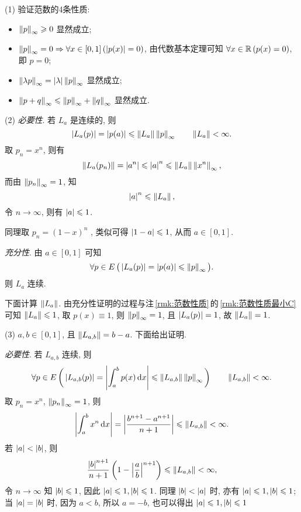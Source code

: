     \begin{Proof}
        (1) 验证范数的4条性质:
        \begin{itemize}
            \item $ \left\| p \right\|_{\infty}\geqslant 0 $ 显然成立;
            \item $ \left\| p \right\|_{\infty}=0 \Rightarrow \forall x\in [0, 1]\,(\left| p(x) \right| =0) $, 由代数基本定理可知 $ \forall x\in\mathbb{R}\,(p(x)=0) $, 即 $ p=0 $;
            \item $ \left\| \lambda p \right\|_{\infty}=\left| \lambda \right| \left\| p \right\|_{\infty} $ 显然成立;
            \item $ \left\| p+q \right\|_{\infty}\leqslant\left\| p \right\|_{\infty}+\left\| q \right\|_{\infty} $ 显然成立.
        \end{itemize}

        (2) \textsl{必要性}. 若 $ L_{a} $ 是连续的, 则
        \[
            \left| L_{a}(p) \right| =\left| p(a) \right| \leqslant \left\| L_{a} \right\|\left\| p \right\|_{\infty}\qquad\left\| L_{a} \right\|<\infty.
        \]
        取 $ p_{n}=x^{n} $, 则有
        \[
            \left\| L_{a}(p_{n}) \right\|=\left| a^{n} \right| \leqslant\left| a \right| ^{n}\leqslant \left\| L_{a} \right\|\left\| x^{n} \right\|_{\infty},
        \]
        而由 $ \left\| p_{n} \right\|_{\infty}=1 $, 知
        \[
            \left| a \right| ^{n}\leqslant\left\| L_{a} \right\|,
        \]
        令 $ n\to\infty $, 则有 $ \left| a \right| \leqslant1 $. 

        同理取 $ p_{n}=(1-x)^{n} $ , 类似可得 $ \left| 1-a \right| \leqslant1 $, 从而 $ a\in[0, 1] $.

        \textsl{充分性}. 由 $ a\in[0, 1] $ 可知
        \[
            \forall p\in E\,\big(\left| L_{a}(p) \right| =\left| p(a) \right| \leqslant\left\| p \right\|_{\infty}\big).
        \]
        则 $ L_{a} $ 连续.

        下面计算 $ \left\| L_{a} \right\| $. 由充分性证明的过程与注\,\ref{rmk:范数性质}\,的\,\ref{rmk:范数性质最小C}\,可知 $ \left\| L_{a} \right\|\leqslant1 $, 取 $ p(x)\equiv 1 $, 则 $ \left\| p \right\|_{\infty}=1 $, 且 $ \left| L_{a}(p) \right| =1 $, 故 $ \left\| L_{a} \right\|=1 $.

        (3) $ a, b\in[0, 1] $, 且 $ \left\| L_{a, b} \right\|=b-a $. 下面给出证明.

        \textsl{必要性}. 若 $ L_{a, b} $ 连续, 则
        \[
            \forall p\in E\,\bigg(\left| L_{a, b}(p) \right| =\left| \int_{a}^{b}p(x)\,\mathrm{d} x \right| \leqslant \left\| L_{a, b} \right\|\left\| p \right\|_{\infty}\bigg)\qquad \left\| L_{a, b} \right\|<\infty.
        \]
        取 $ p_{n}=x^{n} $, $ \left\| p_{n} \right\|_{\infty}=1 $, 则
        \[
            \left| \int_{a}^{b}x^{n}\,\mathrm{d} x \right| =\left| \frac{b^{n+1}-a^{n+1}}{n+1} \right| \leqslant\left\| L_{a, b} \right\|<\infty.
        \]
        若 $ \left| a \right| <\left| b \right|  $, 则
        \[
            \frac{\left| b \right| ^{n+1}}{n+1}\left( 1-\left| \frac{a}{b} \right| ^{n+1} \right) \leqslant \left\| L_{a, b} \right\|<\infty,
        \]
        令 $ n\to\infty $ 知 $ \left| b \right| \leqslant1 $, 因此 $ \left| a \right| \leqslant1, \left| b \right| \leqslant1 $. 同理 $ \left| b \right| <\left| a \right|  $ 时, 亦有 $ \left| a \right| \leqslant1, \left| b \right| \leqslant1 $; 当 $ \left| a \right| =\left| b \right|  $ 时, 因为 $ a<b $, 所以 $ a=-b $, 也可以得出 $ \left| a \right| \leqslant1, \left| b \right| \leqslant1 $


\end{Proof}

